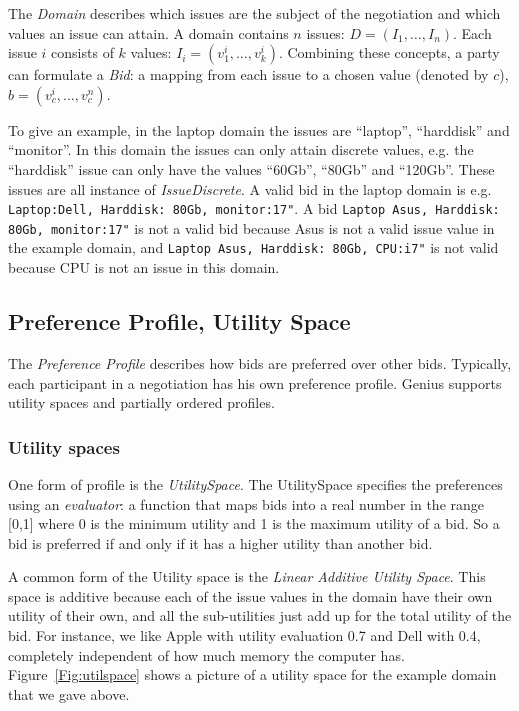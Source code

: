 \documentclass[]{article}
\begin{document}
The \textit{Domain} describes which issues are the subject of the negotiation and which values an issue can attain. A domain contains $n$ issues: $D=(I_1,\ldots,I_n)$. Each issue $i$ consists of $k$ values: $I_i=(v^i_1,\ldots,v^i_k)$.  Combining these concepts, a party can formulate a \textit{Bid}: a mapping from each issue to a chosen value (denoted by $c$), $b=(v^i_{c},\ldots,v^n_{c})$. 

To give an example, in the laptop domain the issues are ``laptop'', ``harddisk'' and ``monitor''. In this domain the issues can only attain discrete values, e.g. the ``harddisk'' issue can only have the values ``60Gb'', ``80Gb'' and ``120Gb''. These issues are all instance of \textit{IssueDiscrete}. A valid bid in the laptop domain is e.g. \verb|Laptop:Dell, Harddisk: 80Gb, monitor:17"|. A bid \verb|Laptop Asus, Harddisk: 80Gb, monitor:17"| is not a valid bid because Asus is not a valid issue value in the example domain, and \verb|Laptop Asus, Harddisk: 80Gb, CPU:i7"|  is not valid because CPU is not an issue in this domain. 

\subsection{Preference Profile, Utility Space}
The \textit{Preference Profile} describes how bids are preferred over other bids. Typically, each participant in a negotiation has his own preference profile. Genius supports utility spaces and partially ordered profiles.

\subsubsection{Utility spaces}
One form of profile is the \textit{UtilitySpace}. The UtilitySpace specifies the preferences using an \textit{evaluator}: a function that maps bids into a real number in the range [0,1] where 0 is the minimum utility and 1 is the maximum utility of a bid. So a bid is preferred if and only if it has a higher utility than another bid.

A common form of the Utility space is the \textit{Linear Additive Utility Space}. This space is additive because each of the issue values in the domain have their own utility of their own, and all the sub-utilities just add up for the total utility of the bid. For instance, we like Apple with utility evaluation 0.7 and Dell with 0.4, completely independent of how much memory the computer has. Figure~\ref{Fig:utilspace} shows a picture of a utility space for the example domain that we gave above.
\end{document}
